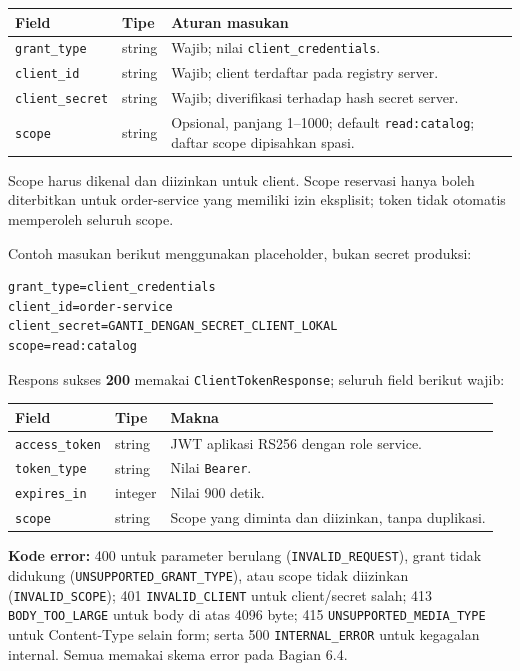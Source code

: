 \documentclass[12pt,a4paper]{article}
\newcommand{\code}[1]{{\small\nolinkurl{#1}}}
\begin{document}
\begin{small}
\begin{tabularx}{\linewidth}{@{}l l Y@{}}
\toprule Field & Tipe & Aturan masukan\\\midrule
\code{grant_type} & string & Wajib; nilai \code{client_credentials}.\\
\code{client_id} & string & Wajib; client terdaftar pada registry server.\\
\code{client_secret} & string & Wajib; diverifikasi terhadap hash secret server.\\
\code{scope} & string & Opsional, panjang 1--1000; default \code{read:catalog}; daftar scope dipisahkan spasi.\\
\bottomrule
\end{tabularx}
\end{small}

Scope harus dikenal dan diizinkan untuk client. Scope reservasi hanya boleh diterbitkan untuk order-service yang memiliki izin eksplisit; token tidak otomatis memperoleh seluruh scope.

Contoh masukan berikut menggunakan placeholder, bukan secret produksi:
\begin{lstlisting}
grant_type=client_credentials
client_id=order-service
client_secret=GANTI_DENGAN_SECRET_CLIENT_LOKAL
scope=read:catalog
\end{lstlisting}

Respons sukses \textbf{200} memakai \code{ClientTokenResponse}; seluruh field berikut wajib:
\begin{small}
\begin{tabularx}{\linewidth}{@{}l l Y@{}}
\toprule Field & Tipe & Makna\\\midrule
\code{access_token} & string & JWT aplikasi RS256 dengan role service.\\
\code{token_type} & string & Nilai \code{Bearer}.\\
\code{expires_in} & integer & Nilai 900 detik.\\
\code{scope} & string & Scope yang diminta dan diizinkan, tanpa duplikasi.\\
\bottomrule
\end{tabularx}
\end{small}

\textbf{Kode error:} 400 untuk parameter berulang (\code{INVALID_REQUEST}), grant tidak didukung (\code{UNSUPPORTED_GRANT_TYPE}), atau scope tidak diizinkan (\code{INVALID_SCOPE}); 401 \code{INVALID_CLIENT} untuk client/secret salah; 413 \code{BODY_TOO_LARGE} untuk body di atas 4096 byte; 415 \code{UNSUPPORTED_MEDIA_TYPE} untuk Content-Type selain form; serta 500 \code{INTERNAL_ERROR} untuk kegagalan internal. Semua memakai skema error pada Bagian 6.4.
\end{document}
